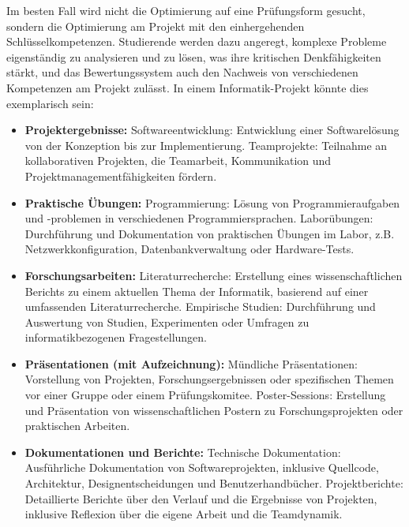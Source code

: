 \documentclass[conference]{IEEEtran}
\begin{document}
Im besten Fall wird nicht die Optimierung auf eine Prüfungsform gesucht, sondern die Optimierung am Projekt mit den einhergehenden Schlüsselkompetenzen. Studierende werden dazu angeregt, komplexe Probleme eigenständig zu analysieren und zu lösen, was ihre kritischen Denkfähigkeiten stärkt, und das Bewertungssystem auch den Nachweis von verschiedenen Kompetenzen am Projekt zulässt. In einem Informatik-Projekt könnte dies exemplarisch sein:

\begin{itemize}[leftmargin=*]
    \item \textbf{Projektergebnisse:}
    \newline Softwareentwicklung: Entwicklung einer Softwarelösung von der Konzeption bis zur Implementierung.
    \newline Teamprojekte: Teilnahme an kollaborativen Projekten, die Teamarbeit, Kommunikation und Projektmanagementfähigkeiten fördern.

    \item \textbf{Praktische Übungen:}
    \newline Programmierung: Lösung von Programmieraufgaben und -problemen in verschiedenen Programmiersprachen.
    \newline Laborübungen: Durchführung und Dokumentation von praktischen Übungen im Labor, z.B. Netzwerkkonfiguration, Datenbankverwaltung oder Hardware-Tests.

    \item \textbf{Forschungsarbeiten:}
    \newline Literaturrecherche: Erstellung eines wissenschaftlichen Berichts zu einem aktuellen Thema der Informatik, basierend auf einer umfassenden Literaturrecherche.
    \newline Empirische Studien: Durchführung und Auswertung von Studien, Experimenten oder Umfragen zu informatikbezogenen Fragestellungen.

    \item \textbf{Präsentationen (mit Aufzeichnung):}
    \newline Mündliche Präsentationen: Vorstellung von Projekten, Forschungsergebnissen oder spezifischen Themen vor einer Gruppe oder einem Prüfungskomitee.
    \newline Poster-Sessions: Erstellung und Präsentation von wissenschaftlichen Postern zu Forschungsprojekten oder praktischen Arbeiten.

    \item \textbf{Dokumentationen und Berichte:}
    \newline Technische Dokumentation: Ausführliche Dokumentation von Softwareprojekten, inklusive Quellcode, Architektur, Designentscheidungen und Benutzerhandbücher.
    \newline Projektberichte: Detaillierte Berichte über den Verlauf und die Ergebnisse von Projekten, inklusive Reflexion über die eigene Arbeit und die Teamdynamik.


\end{itemize}
\end{document}
